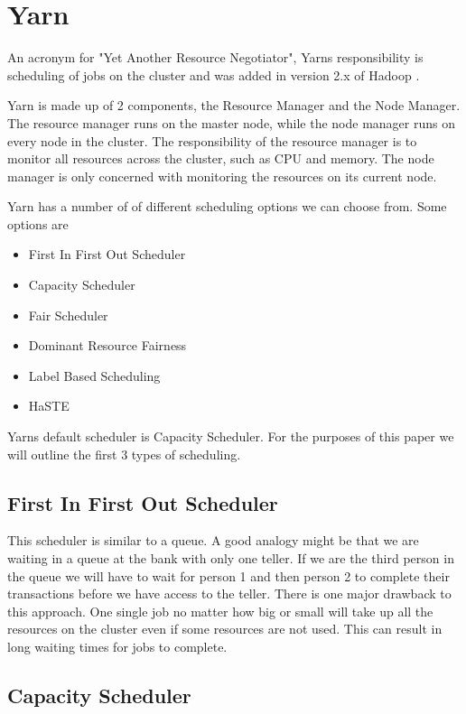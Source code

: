 \section{Yarn}

An acronym for "Yet Another Resource Negotiator", Yarns responsibility is scheduling of jobs on the cluster and was added in version 2.x of Hadoop \cite[pg.1]{yarn-scheduling}.

Yarn is made up of 2 components, the Resource Manager and the Node Manager. The resource manager runs on the master node, while the node manager runs on every node in the cluster. The responsibility of the resource manager is to monitor all resources across the cluster, such as CPU and memory. The node manager is only concerned with monitoring the resources on its current node.

Yarn has a number of of different scheduling options we can choose from. Some options are \cite[pg.2]{yarn-scheduling}

\begin{itemize}
\item First In First Out Scheduler 
\item Capacity Scheduler
\item Fair Scheduler 
\item Dominant Resource Fairness
\item Label Based Scheduling
\item HaSTE
\end{itemize}

Yarns default scheduler is Capacity Scheduler. For the purposes of this paper we will outline the first 3 types of scheduling.

\subsection{First In First Out Scheduler}

This scheduler is similar to a queue. A good analogy might be that we are waiting in a queue at the bank with only one teller. If we are the third person in the queue we will have to wait for person 1 and then person 2 to complete their transactions before we have access to the teller. 
There is one major drawback to this approach. One single job no matter how big or small will take up all the resources on the cluster even if some resources are not used. This can result in long waiting times for jobs to complete.

\subsection{Capacity Scheduler}

